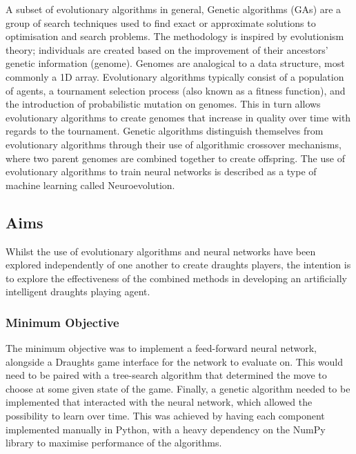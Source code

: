 \documentclass[12pt,a4paper]{article}
\begin{document}
    A subset of evolutionary algorithms in general, Genetic algorithms (GAs) are a group of search techniques used to find exact or approximate solutions to optimisation and search problems. The methodology is inspired by evolutionism theory; individuals are created based on the improvement of their ancestors' genetic information (genome). Genomes are analogical to a data structure, most commonly a 1D array. Evolutionary algorithms typically consist of a population of agents, a tournament selection process (also known as a fitness function), and the introduction of probabilistic mutation on genomes. This in turn allows evolutionary algorithms to create genomes that increase in quality over time with regards to the tournament. Genetic algorithms distinguish themselves from evolutionary algorithms through their use of algorithmic crossover mechanisms, where two parent genomes are combined together to create offspring. The use of evolutionary algorithms to train neural networks is described as a type of machine learning called Neuroevolution.

    \subsection{Aims}

    Whilst the use of evolutionary algorithms and neural networks have been explored independently of one another to create draughts players, the intention is to explore the effectiveness of the combined methods in developing an artificially intelligent draughts playing agent. 

    \subsubsection{Minimum Objective}

        The minimum objective was to implement a feed-forward neural network, alongside a Draughts game interface for the network to evaluate on. This would need to be paired with a tree-search algorithm that determined the move to choose at some given state of the game. Finally, a genetic algorithm needed to be implemented that interacted with the neural network, which allowed the possibility to learn over time. This was achieved by having each component implemented manually in Python, with a heavy dependency on the NumPy library to maximise performance of the algorithms.
\end{document}
